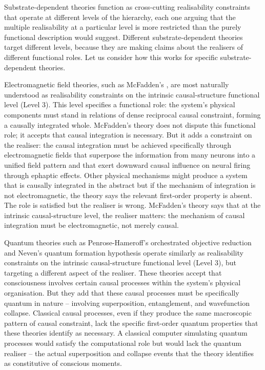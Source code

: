 \documentclass[11pt, a4paper, onecolumn, gdm]{google}
\begin{document}
Substrate-dependent theories function as cross-cutting realisability constraints that operate at different levels of the hierarchy, each one arguing that the multiple realisability at a particular level is more restricted than the purely functional description would suggest.
Different substrate-dependent theories target different levels, because they are making claims about the realisers of different functional roles.
Let us consider how this works for specific substrate-dependent theories.

Electromagnetic field theories, such as McFadden's \citep{mcfadden2020}, are most naturally understood as realisability constraints on the intrinsic causal-structure functional level (Level 3).
This level specifies a functional role: the system's physical components must stand in relations of dense reciprocal causal constraint, forming a causally integrated whole.
McFadden's theory does not dispute this functional role; it accepts that causal integration is necessary.
But it adds a constraint on the realiser: the causal integration must be achieved specifically through electromagnetic fields that superpose the information from many neurons into a unified field pattern and that exert downward causal influence on neural firing through ephaptic effects.
Other physical mechanisms might produce a system that is causally integrated in the abstract but if the mechanism of integration is not electromagnetic, the theory says the relevant first-order property is absent.
The role is satisfied but the realiser is wrong.
McFadden's theory says that at the intrinsic causal-structure level, the realiser matters: the mechanism of causal integration must be electromagnetic, not merely causal.

Quantum theories such as Penrose-Hameroff's orchestrated objective reduction \citep{hameroff2014} and Neven's quantum formation hypothesis \citep{neven2024} operate similarly as realisability constraints on the intrinsic causal-structure functional level (Level 3), but targeting a different aspect of the realiser.
These theories accept that consciousness involves certain causal processes within the system's physical organisation.
But they add that these causal processes must be specifically quantum in nature -- involving superposition, entanglement, and wavefunction collapse.
Classical causal processes, even if they produce the same macroscopic pattern of causal constraint, lack the specific first-order quantum properties that these theories identify as necessary.
A classical computer simulating quantum processes would satisfy the computational role but would lack the quantum realiser -- the actual superposition and collapse events that the theory identifies as constitutive of conscious moments.
\end{document}
